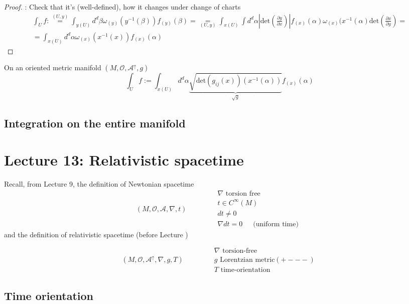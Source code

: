 \documentclass[10pt]{amsart}
\begin{document}
\begin{multicols*}{2}
	\begin{proof}: Check that it's (well-defined), how it changes under change of charts
		\[
		\begin{gathered}
		\int_U f :\overset{ (U,y) }{=} \int_{y(U)} d^d\beta \omega_{(y)}(y^{-1}(\beta)) f_{(y)}(\beta) = \underset{ (U,y)}{=} \int_{x(U)} \int d^d\alpha \left| \text{det}\left( \frac{ \partial y }{ \partial x}\right) \right| f_{(x)}(\alpha) \omega_{(x)}(x^{-1}(\alpha) \text{det}\left( \frac{ \partial x}{ \partial y } \right) = \\
		= \int_{x(U)} d^d \alpha \omega_{(x)}(x^{-1}(x)) f_{(x)}(\alpha)
		\end{gathered}
		\]
	\end{proof}
	
	On an oriented metric manifold $(M,\mathcal{O}, \mathcal{A}^{\uparrow}, g)$
	\[
	\int_Uf:= \int_{x(U)} d^d\alpha  \underbrace{  \sqrt{ \text{det}(g_{ij}(x))(x^{-1}(\alpha)) } }_{\sqrt{g}}  f_{(x)}(\alpha)
	\]
	
	\subsection{Integration on the entire manifold}
	
	\section{Lecture 13: Relativistic spacetime}
	
	Recall, from Lecture 9, the definition of Newtonian spacetime
	\[
	(M, \mathcal{O}, \mathcal{A}, \nabla, t) \quad \quad \quad \, \begin{aligned}
	& \nabla \text{ torsion free } \\
	& t \in C^{\infty}(M) \\ 
	& dt \neq 0 \\
	& \nabla dt = 0   \quad \, \text{ (uniform time) }
	\end{aligned}
	\]
	and the definition of relativistic spacetime (before Lecture )
	
	
	\[
	(M, \mathcal{O}, \mathcal{A}^{\uparrow}, \nabla, g, T ) \quad \quad \quad \, \begin{aligned}
	& \nabla \text{ torsion-free } \\
	& g \text{ Lorentzian metric} (+---) \\ 
	& T \text{ time-orientation }
	\end{aligned}
	\]
	
	\subsection{Time orientation}
	

\end{multicols*}
\end{document}
